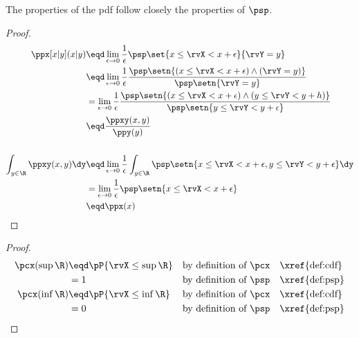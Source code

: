 The properties of the pdf follow closely the properties of  $\psp$.
\begin{theorem}
\end{theorem}
\begin{proof}
\begin{align*}
  \ppx[x|y](x|y)
    &\eqd \lim_{\epsilon\to0} \frac{1}{\epsilon} \psp\set{x\le\rvX < x+\epsilon}{\rvY=y}
  \\&\eqd \lim_{\epsilon\to0} \frac{1}{\epsilon} \frac{\psp\setn{(x\le\rvX < x+\epsilon) \land (\rvY=y)}}
                                                      {\psp\setn{\rvY=y}}
  \\&=    \lim_{\epsilon\to0} \frac{1}{\epsilon} \frac{\psp\setn{(x\le\rvX < x+\epsilon) \land (y\le\rvY<y+h)}}
                                                      {\psp\setn{y\le\rvY<y+\epsilon}}
  \\&\eqd \frac{\ppxy(x,y)}{\ppy(y)}
\\
\\
  \int_{y\in\R}\ppxy(x,y)\dy
    &\eqd \lim_{\epsilon\to0} \frac{1}{\epsilon}
          \int_{y\in\R} \psp\setn{x\le\rvX<x+\epsilon, y\le\rvY<y+\epsilon} \dy
  \\&=    \lim_{\epsilon\to0} \frac{1}{\epsilon} \psp\setn{x\le\rvX<x+\epsilon}
  \\&\eqd \ppx(x)
\end{align*}
\end{proof}

\begin{theorem}
\label{thm:cdf}
\end{theorem}
\begin{proof}
\begin{align*}
  \pcx(\sup\R)
    &\eqd \pP{\rvX\le\sup\R} && \text{by definition of $\pcx$} &&\text{\xref{def:cdf}}
  \\&=    1                  && \text{by definition of $\psp$} &&\text{\xref{def:psp}}
  \\
  \pcx(\inf\R)
    &\eqd \pP{\rvX\le\inf\R} && \text{by definition of $\pcx$} &&\text{\xref{def:cdf}}
  \\&=    0                  && \text{by definition of $\psp$} &&\text{\xref{def:psp}}
\end{align*}
\end{proof}

